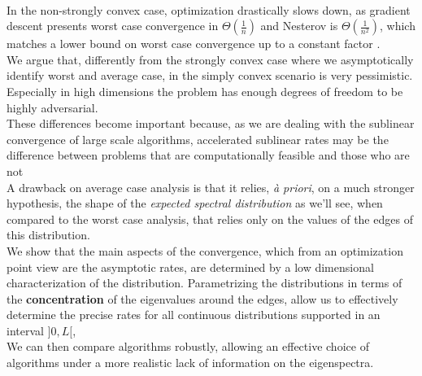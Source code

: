 \documentclass{article}
\begin{document}

\paragraph{}
In the non-strongly convex case, optimization drastically slows down, as gradient descent presents worst case convergence in $\Theta(\frac{1}{n})$ and Nesterov is $\Theta(\frac{1}{n^2})$, which matches a lower bound on worst case convergence up to a constant factor \cite{nesterov2003introductory}. \\
We argue that, differently from the strongly convex case where we asymptotically identify worst and average case, in the simply convex scenario is very pessimistic. Especially in high dimensions  the problem has enough degrees of freedom to be highly adversarial. \\
These differences become important because, as we are dealing with the sublinear convergence of large scale algorithms,  accelerated sublinear rates may be the difference between problems that are computationally feasible and those who are not  \\
A drawback on average case analysis is that it relies, \textit{à priori}, on a much stronger hypothesis, the shape of the \textit{expected spectral distribution} as we'll see, when compared to the worst case analysis, that relies only on the values of the edges of this distribution. \\
We show that the main aspects of the convergence, which from an optimization point view are the asymptotic rates, are determined by a low dimensional characterization of the distribution. Parametrizing the distributions in terms of the \textbf{concentration} of the eigenvalues around the edges, allow us to effectively determine the precise rates for all continuous distributions supported in an interval $]0,L[$, \\
We can then compare algorithms robustly, allowing an effective choice of algorithms under a more realistic lack of information on the eigenspectra. \\
\end{document}
